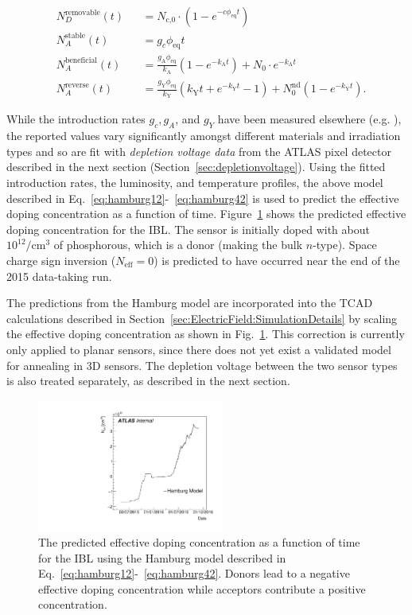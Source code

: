 \begin{align}
\label{eq:hamburg12}
&N_{D}^\text{removable}(t) &&=N_\text{c,0}\cdot \left( 1-e^{-c\phi_\text{eq}t} \right) \\ \label{eq:hamburg22}
&N_{A}^\text{stable}(t) &&= g_c \phi_\text{eq}t \\ \label{eq:hamburg32}
&N_{A}^\text{beneficial}(t)  &&=\frac{g_\text{A}\phi_\text{eq}}{k_\text{A}} \left( 1-e^{-k_\text{A}t} \right) + N_0 \cdot e^{-k_\text{A}t} \\ \label{eq:hamburg42}
&N_{A}^\text{reverse}(t)  &&= \frac{g_\text{Y}\phi_\text{eq}}{k_\text{Y}} \left( k_\text{Y}t + e^{-k_\text{Y}t} -1  \right) + N_0^\text{nd} \left( 1-e^{-k_\text{Y}t} \right).
\end{align}

While the introduction rates $g_c,g_A$, and $g_Y$ have been measured elsewhere (e.g. \cite{Lindstrom:421210}), the reported values vary significantly amongst different materials and irradiation types and so are fit with \textit{depletion voltage data} from the ATLAS pixel detector described in the next section (Section~\ref{sec:depletionvoltage}).  Using the fitted introduction rates, the luminosity, and temperature profiles, the above model described in Eq.~\ref{eq:hamburg12}-~\ref{eq:hamburg42} is used to predict the effective doping concentration as a function of time.  Figure~\ref{fig:electricfield:neff} shows the predicted effective doping concentration for the IBL.  The sensor is initially doped with about $10^{12}/\text{cm}^3$ of phosphorous, which is a donor (making the bulk $n$-type).  Space charge sign inversion ($N_\text{eff}=0$) is predicted to have occurred near the end of the 2015 data-taking run.

The predictions from the Hamburg model are incorporated into the TCAD calculations described in Section~\ref{sec:ElectricField:SimulationDetails} by scaling the effective doping concentration as shown in Fig.~\ref{fig:electricfield:neff}.  This correction is currently only applied to planar sensors, since there does not yet exist a validated model for annealing in 3D sensors.  The depletion voltage between the two sensor types is also treated separately, as described in the next section.

\begin{figure}[!htpb]
\centering
\includegraphics[width=0.55\textwidth]{neff_added}
\caption{The predicted effective doping concentration as a function of time for the IBL using the Hamburg model described in Eq.~\ref{eq:hamburg12}-~\ref{eq:hamburg42}. Donors lead to a negative effective doping concentration while acceptors contribute a positive concentration.  }
\label{fig:electricfield:neff}
\end{figure}

